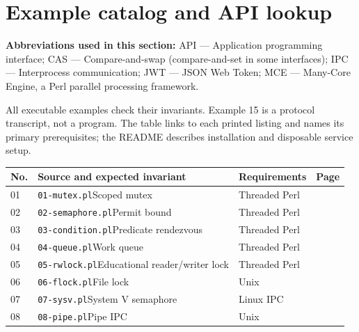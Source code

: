 \chapter{Example catalog and API lookup}\label{app:catalog}
\par\smallskip\noindent\textbf{Abbreviations used in this section:} API --- Application programming interface; CAS --- Compare-and-swap (compare-and-set in some interfaces); IPC --- Interprocess communication; JWT --- JSON Web Token; MCE --- Many-Core Engine, a Perl parallel processing framework.\par\smallskip
All executable examples check their invariants. Example 15 is a
protocol transcript, not a program. The table links to each printed
listing and names its primary prerequisites; the README describes
installation and disposable service setup.
\begin{longtable}{L{.06\linewidth}L{.41\linewidth}L{.31\linewidth}L{.08\linewidth}}
\toprule No. & Source and expected invariant & Requirements & Page\\ \midrule{} & \nolinkurl{01-mutex.pl}\newline Scoped mutex & Threaded Perl & \pageref{listing:examples/01-mutex.pl}\\
02 & \nolinkurl{02-semaphore.pl}\newline Permit bound & Threaded Perl & \pageref{listing:examples/02-semaphore.pl}\\
03 & \nolinkurl{03-condition.pl}\newline Predicate rendezvous & Threaded Perl & \pageref{listing:examples/03-condition.pl}\\
04 & \nolinkurl{04-queue.pl}\newline Work queue & Threaded Perl & \pageref{listing:examples/04-queue.pl}\\
05 & \nolinkurl{05-rwlock.pl}\newline Educational reader/writer lock & Threaded Perl & \pageref{listing:examples/05-rwlock.pl}\\
06 & \nolinkurl{06-flock.pl}\newline File lock & Unix & \pageref{listing:examples/06-flock.pl}\\
07 & \nolinkurl{07-sysv.pl}\newline System V semaphore & Linux IPC & \pageref{listing:examples/07-sysv.pl}\\
08 & \nolinkurl{08-pipe.pl}\newline Pipe IPC & Unix & \pageref{listing:examples/08-pipe.pl}\\

\end{longtable}
